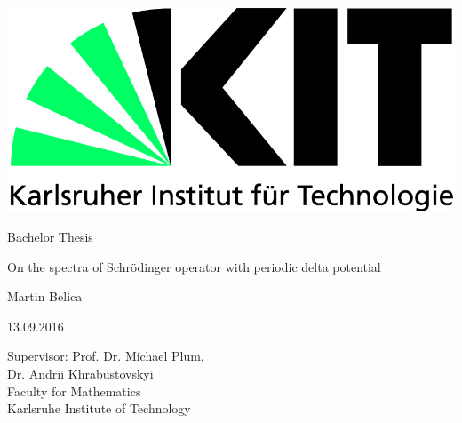 \pagestyle{empty}
\begin{titlepage}

  \includegraphics[scale=0.45]{kit-logo.jpg}
  \vspace*{2cm} 

  \begin{center} \large 
    
    Bachelor Thesis
    \vspace*{2cm}

    {\huge On the spectra of Schrödinger operator with periodic delta potential}
    \vspace*{2.5cm}

    Martin Belica
    \vspace*{0.5cm}

    13.09.2016
    \vspace*{4cm}


    Supervisor: Prof. Dr. Michael Plum, \\
    Dr. Andrii Khrabustovskyi \\[1cm]
    Faculty for Mathematics \\[1cm]
	Karlsruhe Institute of Technology
  \end{center}
\end{titlepage}